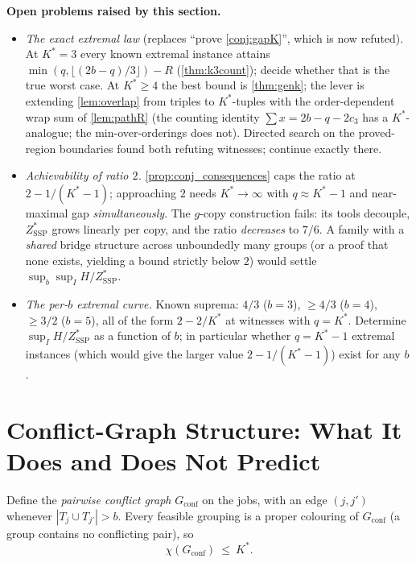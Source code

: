 \documentclass[11pt,a4paper]{article}
\theoremstyle{plain}
\theoremstyle{definition}
\newcommand{\Kstar}{K^{*}}
\newcommand{\ZSSP}{Z_{\mathrm{SSP}}^{*}}
\begin{document}
\begin{openproblem}
\textbf{Open problems raised by this section.}
\begin{itemize}
\item \emph{The exact extremal law} (replaces ``prove \cref{conj:gapK}'',
which is now refuted). At $\Kstar=3$ every known extremal instance attains
$\min(q,\lfloor(2b-q)/3\rfloor)-R$ (\cref{thm:k3count}); decide whether that
is the true worst case. At $\Kstar\ge4$ the best bound is \cref{thm:genk};
the lever is extending \cref{lem:overlap} from triples to $\Kstar$-tuples
with the order-dependent wrap sum of \cref{lem:pathR} (the counting identity
$\sum x=2b-q-2c_3$ has a $\Kstar$-analogue; the min-over-orderings does not).
Directed search on the proved-region boundaries found both refuting
witnesses; continue exactly there.
\item \emph{Achievability of ratio $2$.} \cref{prop:conj_consequences} caps the ratio at
$2-1/(\Kstar-1)$; approaching $2$ needs $\Kstar\to\infty$ with $q\approx\Kstar-1$ and
near-maximal gap \emph{simultaneously}. The $g$-copy construction fails: its tools
decouple, $\ZSSP$ grows linearly per copy, and the ratio \emph{decreases} to $7/6$. A
family with a \emph{shared} bridge structure across unboundedly many groups (or a proof
that none exists, yielding a bound strictly below $2$) would settle
$\sup_{b}\sup_{I}H/\ZSSP$.
\item \emph{The per-$b$ extremal curve.} Known suprema: $4/3$ ($b{=}3$), $\ge4/3$
($b{=}4$), $\ge3/2$ ($b{=}5$), all of the form $2-2/\Kstar$ at witnesses with
$q=\Kstar$. Determine $\sup_I H/\ZSSP$ as a function of $b$; in particular whether
$q=\Kstar-1$ extremal instances (which would give the larger value $2-1/(\Kstar-1)$)
exist for any $b$.
\end{itemize}
\end{openproblem}

\section{Conflict-Graph Structure: What It Does and Does Not Predict}
\label{sec:conflict}

Define the \emph{pairwise conflict graph} $G_{\mathrm{conf}}$ on the jobs, with an edge
$(j,j')$ whenever $|T_j\cup T_{j'}|>b$. Every feasible grouping is a proper colouring of
$G_{\mathrm{conf}}$ (a group contains no conflicting pair), so
\[
  \chi(G_{\mathrm{conf}})\ \le\ \Kstar .
\]
\end{document}
